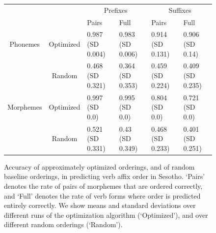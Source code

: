 \begin{figure}
\begin{tabular}{cc||ll|ll}
             &              & \multicolumn{2}{c}{Prefixes}    & \multicolumn{2}{|c}{Suffixes} \\
             &              & Pairs & Full & Pairs & Full \\ \hline\hline
             Phonemes   &   Optimized  &  0.987 (SD 0.004) & 0.983 (SD 0.006) & 0.914 (SD 0.131) & 0.906 (SD 0.14) \\
           &   Random  &  0.468 (SD 0.321) & 0.364 (SD 0.353) & 0.459 (SD 0.224) & 0.409 (SD 0.235) \\ \hline
Morphemes  &   Optimized  &  0.997 (SD 0.0) & 0.995 (SD 0.0) & 0.804 (SD 0.0) & 0.721 (SD 0.0) \\
           &   Random  &  0.521 (SD 0.331) & 0.43 (SD 0.349) & 0.468 (SD 0.233) & 0.401 (SD 0.251) \\
\end{tabular}
\caption{Accuracy of approximately optimized orderings, and of random baseline orderings, in predicting verb affix order in Sesotho. `Pairs' denotes the rate of pairs of morphemes that are ordered correctly, and `Full' denotes the rate of verb forms where order is predicted entirely correctly. We show means and standard deviations over different runs of the optimization algorithm (`Optimized'), and over different random orderings (`Random').}\label{fig:acc-sesotho}
\end{figure}
